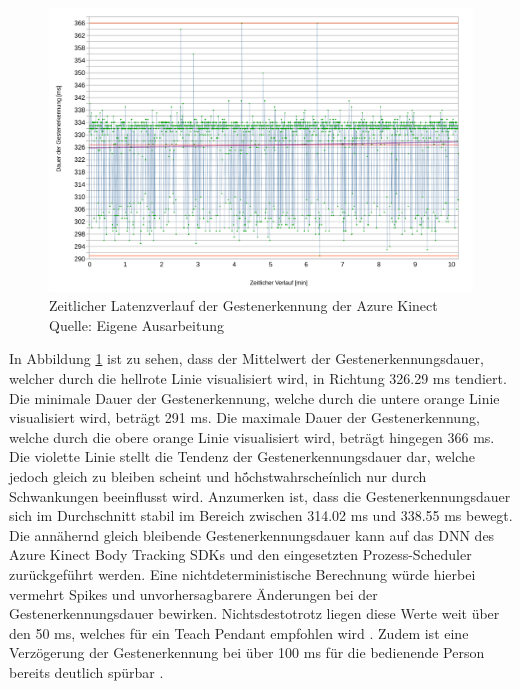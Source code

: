 \begin{figure}[htb]
	\centering
	\includegraphics[width=1.04\textwidth]{images/ergebnisse/dauer_der_gestenerkennung_verlauf}
	\caption[Zeitlicher Latenzverlauf der Gestenerkennung der Azure Kinect]{Zeitlicher Latenzverlauf der Gestenerkennung der Azure Kinect\\Quelle: Eigene Ausarbeitung}
	\label{fig:measurement_gesture_recognition_azure_kinect}
\end{figure}
\FloatBarrier

In Abbildung \ref{fig:measurement_gesture_recognition_azure_kinect} ist zu sehen, dass der Mittelwert der Gestenerkennungsdauer, welcher durch die hellrote Linie visualisiert wird, in Richtung \num{326,29} ms tendiert. Die minimale Dauer der Gestenerkennung, welche durch die untere orange Linie visualisiert wird, beträgt \num{291} ms. Die maximale Dauer der Gestenerkennung, welche durch die obere orange Linie visualisiert wird, beträgt hingegen \num{366} ms. Die violette Linie stellt die Tendenz der Gestenerkennungsdauer dar, welche jedoch gleich zu bleiben scheint und hö́chstwahrscheínlich nur durch Schwankungen beeinflusst wird. Anzumerken ist, dass die Gestenerkennungsdauer sich im Durchschnitt stabil im Bereich zwischen \num{314,02} ms und \num{338,55} ms bewegt. Die annähernd gleich bleibende Gestenerkennungsdauer kann auf das DNN des Azure Kinect Body Tracking SDKs und den eingesetzten Prozess-Scheduler zurückgeführt werden. Eine nichtdeterministische Berechnung würde hierbei vermehrt Spikes und unvorhersagbarere Änderungen bei der Gestenerkennungsdauer bewirken. Nichtsdestotrotz liegen diese Werte weit über den 50 ms, welches für ein Teach Pendant empfohlen wird \cite[55]{prassler_advances_2004}. Zudem ist eine Verzögerung der Gestenerkennung bei über 100 ms für die bedienende Person bereits deutlich spürbar \cite{miller_response_1968}.

